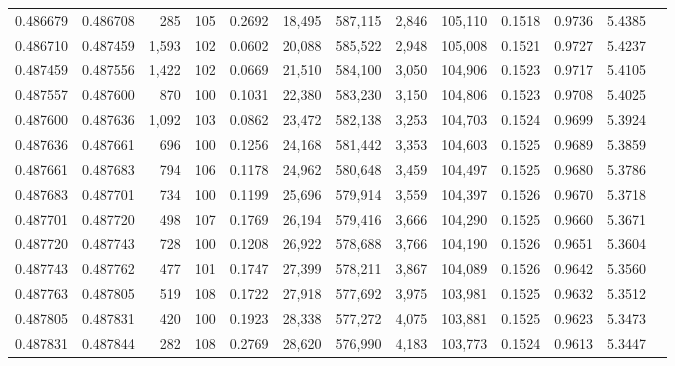 \begin{tabular}{rrrrrrrrrrrrr}
0.486679 & 0.486708 &   285 & 105 &                                     0.2692 &  18,495 & 587,115 &   2,846 & 105,110 & 0.1518 & 0.9736 & 5.4385 \\
0.486710 & 0.487459 & 1,593 & 102 &                                     0.0602 &  20,088 & 585,522 &   2,948 & 105,008 & 0.1521 & 0.9727 & 5.4237 \\
0.487459 & 0.487556 & 1,422 & 102 &                                     0.0669 &  21,510 & 584,100 &   3,050 & 104,906 & 0.1523 & 0.9717 & 5.4105 \\
0.487557 & 0.487600 &   870 & 100 &                                     0.1031 &  22,380 & 583,230 &   3,150 & 104,806 & 0.1523 & 0.9708 & 5.4025 \\
0.487600 & 0.487636 & 1,092 & 103 &                                     0.0862 &  23,472 & 582,138 &   3,253 & 104,703 & 0.1524 & 0.9699 & 5.3924 \\
0.487636 & 0.487661 &   696 & 100 &                                     0.1256 &  24,168 & 581,442 &   3,353 & 104,603 & 0.1525 & 0.9689 & 5.3859 \\
0.487661 & 0.487683 &   794 & 106 &                                     0.1178 &  24,962 & 580,648 &   3,459 & 104,497 & 0.1525 & 0.9680 & 5.3786 \\
0.487683 & 0.487701 &   734 & 100 &                                     0.1199 &  25,696 & 579,914 &   3,559 & 104,397 & 0.1526 & 0.9670 & 5.3718 \\
0.487701 & 0.487720 &   498 & 107 &                                     0.1769 &  26,194 & 579,416 &   3,666 & 104,290 & 0.1525 & 0.9660 & 5.3671 \\
0.487720 & 0.487743 &   728 & 100 &                                     0.1208 &  26,922 & 578,688 &   3,766 & 104,190 & 0.1526 & 0.9651 & 5.3604 \\
0.487743 & 0.487762 &   477 & 101 &                                     0.1747 &  27,399 & 578,211 &   3,867 & 104,089 & 0.1526 & 0.9642 & 5.3560 \\
0.487763 & 0.487805 &   519 & 108 &                                     0.1722 &  27,918 & 577,692 &   3,975 & 103,981 & 0.1525 & 0.9632 & 5.3512 \\
0.487805 & 0.487831 &   420 & 100 &                                     0.1923 &  28,338 & 577,272 &   4,075 & 103,881 & 0.1525 & 0.9623 & 5.3473 \\
0.487831 & 0.487844 &   282 & 108 &                                     0.2769 &  28,620 & 576,990 &   4,183 & 103,773 & 0.1524 & 0.9613 & 5.3447 \\

\end{tabular}
